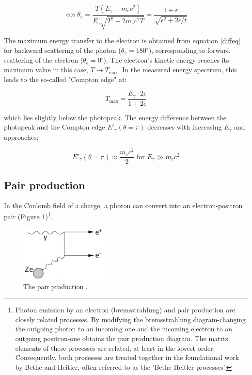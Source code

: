 \begin{equation}
\cos \theta_e = \frac{T(E_\gamma + m_e c^2)}{E_\gamma \sqrt{T^2 + 2m_ec^2 T}} = \frac{1 + \epsilon}{\sqrt{\epsilon^2 + 2\epsilon/t}}
\end{equation}

The maximum energy transfer to the electron is obtained 
from equation \ref{diffeq} for backward scattering of the 
photon ($\theta_\gamma = 180^\circ$), corresponding to 
forward scattering of the electron ($\theta_e = 0^\circ$). 
The electron's kinetic energy reaches its maximum value in 
this case, $T \rightarrow T_{\text{max}}$. In the measured 
energy spectrum, this leads to the so-called "Compton edge" at:

\begin{equation}
T_{\text{max}} = \frac{E_\gamma \cdot 2\epsilon}{1 + 2\epsilon}
\end{equation}

which lies slightly below the photopeak. The energy difference 
between the photopeak and the Compton edge $E'_\gamma(\theta = \pi)$ 
decreases with increasing $E_\gamma$ and approaches:

\begin{equation}
E'_\gamma(\theta = \pi) \approx \frac{m_e c^2}{2} \text{ for } E_\gamma \gg m_e c^2
\end{equation}

\subsection{Pair production}
In the Coulomb field of a charge, a photon can 
convert into an electron-positron pair (Figure 
\ref{fig:pprod})\footnote{Photon emission by an 
electron (bremsstrahlung) and pair production are closely 
related processes. By modifying the bremsstrahlung diagram-changing 
the outgoing photon to an incoming one and the incoming electron to 
an outgoing positron-one obtains the pair production 
diagram. The matrix elements of these processes are 
related, at least in the lowest order. Consequently, both 
processes are treated together in the foundational work by 
Bethe and Heitler, often referred to as the 'Bethe-Heitler processes'.}.

\begin{figure}[!h]
    \centering
    \includegraphics[width=0.4\textwidth]{figures/png/Screenshot_20240812_204755.png}
    \caption[The pair production.]{The pair production \cite{kola}.}
    \label{fig:pprod}
\end{figure}

